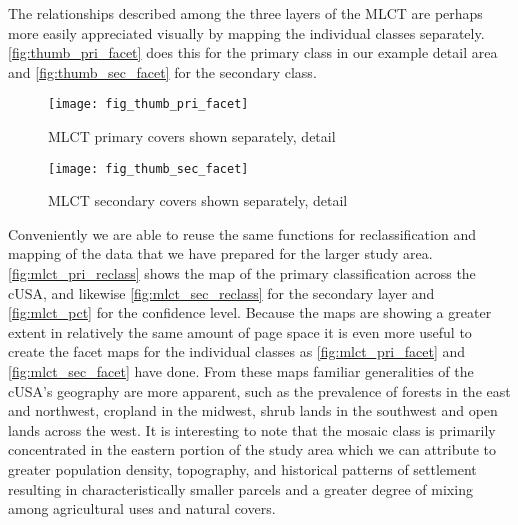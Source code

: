 The relationships described among the three layers of the MLCT are
perhaps more easily appreciated visually by mapping the individual
classes separately.  \autoref{fig:thumb_pri_facet} does this for the
primary class in our example detail area and
\autoref{fig:thumb_sec_facet} for the secondary class.


\begin{figure}[hpt] 
\begin{center}
  

\texttt{[image: fig\_thumb\_pri\_facet]}
\end{center} 
\caption{MLCT primary covers shown separately, detail} 
\label{fig:thumb_pri_facet} 
\end{figure} 


\begin{figure}[hpt] 
\begin{center}
  

\texttt{[image: fig\_thumb\_sec\_facet]}
\end{center} 
\caption{MLCT secondary covers shown separately, detail} 
\label{fig:thumb_sec_facet} 
\end{figure} 


Conveniently we are able to reuse the same functions for
reclassification and mapping of the data that we have prepared for the
larger study area.  \autoref{fig:mlct_pri_reclass} shows the map of
the primary classification across the cUSA, and likewise
\autoref{fig:mlct_sec_reclass} for the secondary layer and
\autoref{fig:mlct_pct} for the confidence level.  Because the maps are
showing a greater extent in relatively the same amount of page space
it is even more useful to create the facet maps for the individual
classes as \autoref{fig:mlct_pri_facet} and
\autoref{fig:mlct_sec_facet} have done.  From these maps familiar
generalities of the cUSA's geography are more apparent, such as the
prevalence of forests in the east and northwest, cropland in the
midwest, shrub lands in the southwest and open lands across the west.
It is interesting to note that the mosaic class is primarily
concentrated in the eastern portion of the study area which we can
attribute to greater population density, topography, and historical
patterns of settlement resulting in characteristically smaller parcels
and a greater degree of mixing among agricultural uses and natural
covers.




